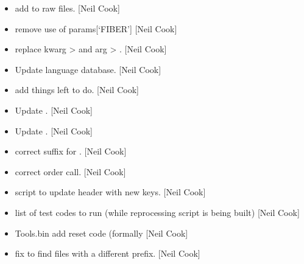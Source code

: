 \documentclass[a4paper,10pt,english]{report}
\begin{document}
\begin{itemize}
\item {} 
 \sphinxhyphen{} add  to raw files. {[}Neil Cook{]}

\item {} 
 \sphinxhyphen{} remove use of params{[}‘FIBER’{]} {[}Neil Cook{]}

\item {} 
 \sphinxhyphen{} replace kwarg \textendash{}\textgreater{}  and arg \textendash{}\textgreater{} .
{[}Neil Cook{]}

\item {} 
Update language database. {[}Neil Cook{]}

\item {} 
 \sphinxhyphen{} add things left to do. {[}Neil Cook{]}

\item {} 
Update . {[}Neil Cook{]}

\item {} 
Update . {[}Neil Cook{]}

\item {} 
 \sphinxhyphen{} correct suffix for
. {[}Neil Cook{]}

\item {} 
 \sphinxhyphen{} correct order call. {[}Neil Cook{]}

\item {} 
 \sphinxhyphen{} script to update  header with
new keys. {[}Neil Cook{]}

\item {} 
 \sphinxhyphen{} list of test codes to run (while
reprocessing script is being built) {[}Neil Cook{]}

\item {} 
Tools.bin \sphinxhyphen{} add reset code (formally  {[}Neil Cook{]}

\item {} 
 \sphinxhyphen{} fix  to find files with a different
prefix. {[}Neil Cook{]}


\end{itemize}
\end{document}

